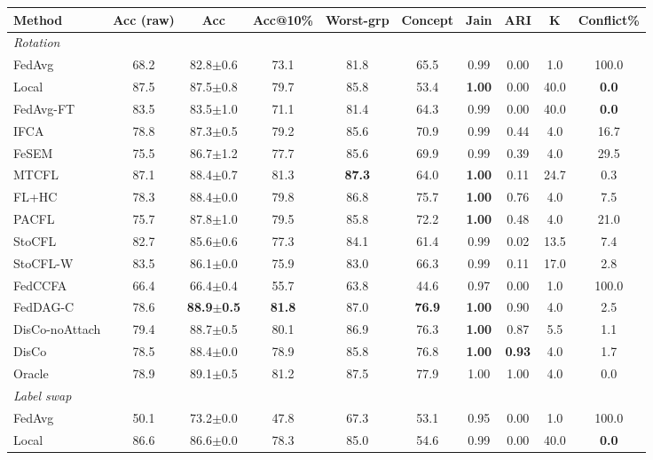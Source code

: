 \scriptsize
\setlength{\tabcolsep}{3.2pt}
\begin{tabular}{lccccccccc}
\toprule
Method & Acc (raw) & Acc & Acc@10\% & Worst-grp & Concept & Jain & ARI & K & Conflict\% \\
\midrule
\multicolumn{10}{l}{\textit{Rotation}}\\
FedAvg & 68.2 & 82.8$\pm$0.6 & 73.1 & 81.8 & 65.5 & 0.99 & 0.00 & 1.0 & 100.0 \\
Local & 87.5 & 87.5$\pm$0.8 & 79.7 & 85.8 & 53.4 & \textbf{1.00} & 0.00 & 40.0 & \textbf{0.0} \\
FedAvg-FT & 83.5 & 83.5$\pm$1.0 & 71.1 & 81.4 & 64.3 & 0.99 & 0.00 & 40.0 & \textbf{0.0} \\
IFCA & 78.8 & 87.3$\pm$0.5 & 79.2 & 85.6 & 70.9 & 0.99 & 0.44 & 4.0 & 16.7 \\
FeSEM & 75.5 & 86.7$\pm$1.2 & 77.7 & 85.6 & 69.9 & 0.99 & 0.39 & 4.0 & 29.5 \\
MTCFL & 87.1 & 88.4$\pm$0.7 & 81.3 & \textbf{87.3} & 64.0 & \textbf{1.00} & 0.11 & 24.7 & 0.3 \\
FL+HC & 78.3 & 88.4$\pm$0.0 & 79.8 & 86.8 & 75.7 & \textbf{1.00} & 0.76 & 4.0 & 7.5 \\
PACFL & 75.7 & 87.8$\pm$1.0 & 79.5 & 85.8 & 72.2 & \textbf{1.00} & 0.48 & 4.0 & 21.0 \\
StoCFL & 82.7 & 85.6$\pm$0.6 & 77.3 & 84.1 & 61.4 & 0.99 & 0.02 & 13.5 & 7.4 \\
StoCFL-W & 83.5 & 86.1$\pm$0.0 & 75.9 & 83.0 & 66.3 & 0.99 & 0.11 & 17.0 & 2.8 \\
FedCCFA & 66.4 & 66.4$\pm$0.4 & 55.7 & 63.8 & 44.6 & 0.97 & 0.00 & 1.0 & 100.0 \\
FedDAG-C & 78.6 & \textbf{88.9$\pm$0.5} & \textbf{81.8} & 87.0 & \textbf{76.9} & \textbf{1.00} & 0.90 & 4.0 & 2.5 \\
DisCo-noAttach & 79.4 & 88.7$\pm$0.5 & 80.1 & 86.9 & 76.3 & \textbf{1.00} & 0.87 & 5.5 & 1.1 \\
DisCo & 78.5 & 88.4$\pm$0.0 & 78.9 & 85.8 & 76.8 & \textbf{1.00} & \textbf{0.93} & 4.0 & 1.7 \\
Oracle & 78.9 & 89.1$\pm$0.5 & 81.2 & 87.5 & 77.9 & 1.00 & 1.00 & 4.0 & 0.0 \\
\midrule
\multicolumn{10}{l}{\textit{Label swap}}\\
FedAvg & 50.1 & 73.2$\pm$0.0 & 47.8 & 67.3 & 53.1 & 0.95 & 0.00 & 1.0 & 100.0 \\
Local & 86.6 & 86.6$\pm$0.0 & 78.3 & 85.0 & 54.6 & 0.99 & 0.00 & 40.0 & \textbf{0.0} \\

\end{tabular}
